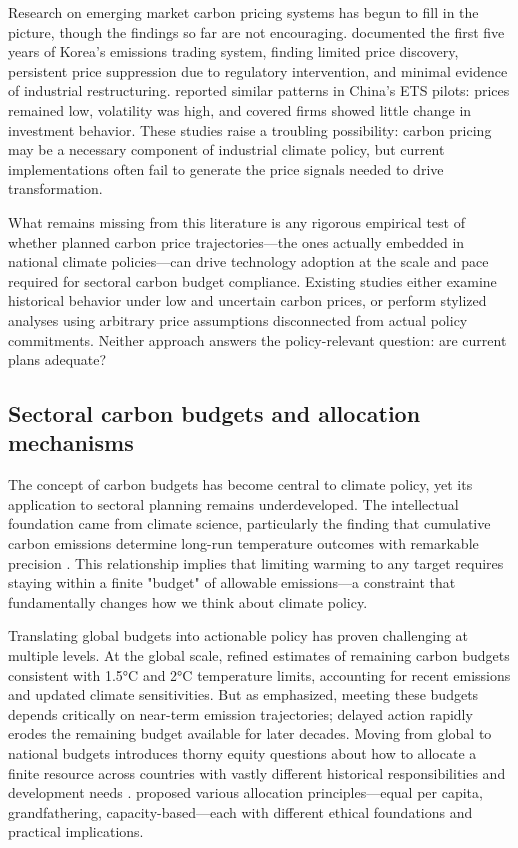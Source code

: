 Research on emerging market carbon pricing systems has begun to fill in the picture, though the findings so far are not encouraging. \citet{kim2021kets} documented the first five years of Korea's emissions trading system, finding limited price discovery, persistent price suppression due to regulatory intervention, and minimal evidence of industrial restructuring. \citet{wang2021carbon} reported similar patterns in China's ETS pilots: prices remained low, volatility was high, and covered firms showed little change in investment behavior. These studies raise a troubling possibility: carbon pricing may be a necessary component of industrial climate policy, but current implementations often fail to generate the price signals needed to drive transformation.

What remains missing from this literature is any rigorous empirical test of whether planned carbon price trajectories—the ones actually embedded in national climate policies—can drive technology adoption at the scale and pace required for sectoral carbon budget compliance. Existing studies either examine historical behavior under low and uncertain carbon prices, or perform stylized analyses using arbitrary price assumptions disconnected from actual policy commitments. Neither approach answers the policy-relevant question: are current plans adequate?

\subsection{Sectoral carbon budgets and allocation mechanisms}

The concept of carbon budgets has become central to climate policy, yet its application to sectoral planning remains underdeveloped. The intellectual foundation came from climate science, particularly the finding that cumulative carbon emissions determine long-run temperature outcomes with remarkable precision \citep{matthews2009proportionality}. This relationship implies that limiting warming to any target requires staying within a finite "budget" of allowable emissions—a constraint that fundamentally changes how we think about climate policy.

Translating global budgets into actionable policy has proven challenging at multiple levels. At the global scale, \citet{rogelj2019new} refined estimates of remaining carbon budgets consistent with 1.5°C and 2°C temperature limits, accounting for recent emissions and updated climate sensitivities. But as \citet{millar2017emission} emphasized, meeting these budgets depends critically on near-term emission trajectories; delayed action rapidly erodes the remaining budget available for later decades. Moving from global to national budgets introduces thorny equity questions about how to allocate a finite resource across countries with vastly different historical responsibilities and development needs \citep{raupach2014sharing}. \citet{robiou2019national} proposed various allocation principles—equal per capita, grandfathering, capacity-based—each with different ethical foundations and practical implications.

